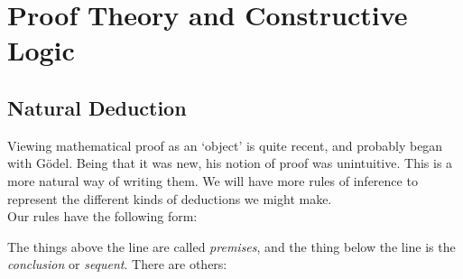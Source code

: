 \documentclass{article}
\theoremstyle{definition}
\numberwithin{definition}{section}
\begin{document}
\setcounter{section}{7}
\section{Proof Theory and Constructive Logic}
\subsection{Natural Deduction}
Viewing mathematical proof as an `object' is quite recent, and probably began with G\"odel. Being that it was new, his notion of proof was unintuitive. This is a more natural way of writing them. We will have more rules of inference to represent the different kinds of deductions we might make.\\
Our rules have the following form:\\
\begin{prooftree}
\end{prooftree}
The things above the line are called \textit{premises}, and the thing below the line is the \textit{conclusion} or \textit{sequent}. There are others:
\begin{prooftree}
\end{prooftree}

\begin{prooftree}
\end{prooftree}

\begin{prooftree}
\end{prooftree}

\begin{prooftree}
\end{prooftree}
\end{document}
